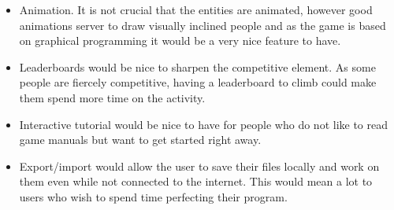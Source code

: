\begin{itemize}
\item Animation. It is not crucial that the entities are animated, however good animations server to draw visually inclined people and as the game is based on graphical programming it would be a very nice feature to have.

\item Leaderboards would be nice to sharpen the competitive element. As some people are fiercely competitive, having a leaderboard to climb could make them spend more time on the activity.

\item Interactive tutorial would be nice to have for people who do not like to read game manuals but want to get started right away.

\item Export/import would allow the user to save their files locally and work on them even while not connected to the internet. This would mean a lot to users who wish to spend time perfecting their program.
\end{itemize}